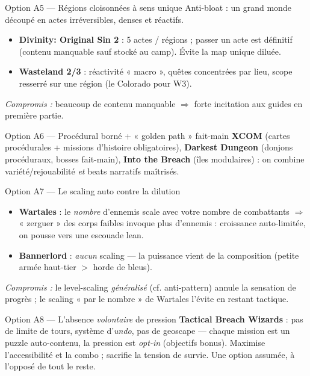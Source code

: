 \documentclass[11pt,a4paper]{article}
\newcommand{\jeu}[1]{\textbf{#1}}
\newcommand{\compromis}[1]{\par\smallskip\textit{\textcolor{warn}{Compromis :}} #1}
\begin{document}
\begin{optionbox}{Option A5 --- Régions cloisonnées à sens unique}
Anti-bloat : un grand monde découpé en actes irréversibles, denses et réactifs.
\begin{itemize}
\item \jeu{Divinity: Original Sin 2} : 5 actes / régions ; passer un acte est définitif (contenu manquable sauf stocké au camp). Évite la map unique diluée.
\item \jeu{Wasteland 2/3} : réactivité « macro », quêtes concentrées par lieu, scope resserré sur une région (le Colorado pour W3).
\end{itemize}
\compromis{beaucoup de contenu manquable $\Rightarrow$ forte incitation aux guides en première partie.}
\end{optionbox}

\begin{optionbox}{Option A6 --- Procédural borné + « golden path » fait-main}
\jeu{XCOM} (cartes procédurales + missions d'histoire obligatoires), \jeu{Darkest Dungeon} (donjons procéduraux, bosses fait-main), \jeu{Into the Breach} (îles modulaires) : on combine variété/rejouabilité \emph{et} beats narratifs maîtrisés.
\end{optionbox}

\begin{optionbox}{Option A7 --- Le scaling auto contre la dilution}
\begin{itemize}
\item \jeu{Wartales} : le \emph{nombre} d'ennemis scale avec votre nombre de combattants $\Rightarrow$ « zerguer » des corps faibles invoque plus d'ennemis : croissance auto-limitée, on pousse vers une escouade lean.
\item \jeu{Bannerlord} : \emph{aucun} scaling — la puissance vient de la composition (petite armée haut-tier $>$ horde de bleus).
\end{itemize}
\compromis{le level-scaling \emph{généralisé} (cf. anti-pattern) annule la sensation de progrès ; le scaling « par le nombre » de Wartales l'évite en restant tactique.}
\end{optionbox}

\begin{optionbox}{Option A8 --- L'absence \emph{volontaire} de pression}
\jeu{Tactical Breach Wizards} : pas de limite de tours, système d'\emph{undo}, pas de geoscape — chaque mission est un puzzle auto-contenu, la pression est \emph{opt-in} (objectifs bonus). Maximise l'accessibilité et la combo ; sacrifie la tension de survie. Une option assumée, à l'opposé de tout le reste.
\end{optionbox}
\end{document}
